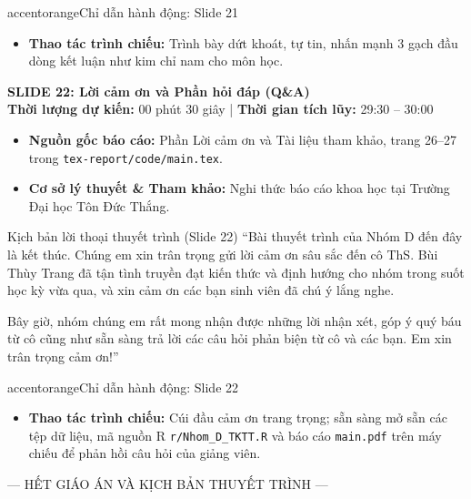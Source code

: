 \documentclass[10pt,a4paper]{article}
\newcommand{\slideheader}[4]{
    \vspace{0.4cm}
    \begin{tcolorbox}[colback=primary!7!white, colframe=primary, arc=2mm, boxrule=1pt, left=4mm, right=4mm, top=2.5mm, bottom=2.5mm]
        {\Large\bfseries\color{primary} SLIDE #1: #2}\\[0.1cm]
        {\small\textbf{Thời lượng dự kiến:} #3 \quad | \quad \textbf{Thời gian tích lũy:} #4}
    \end{tcolorbox}
    \vspace{0.15cm}
}
\begin{document}
\begin{actionbox}{accentorange}{Chỉ dẫn hành động: Slide 21}
    \begin{itemize}
        \item \textbf{Thao tác trình chiếu:} Trình bày dứt khoát, tự tin, nhấn mạnh 3 gạch đầu dòng kết luận như kim chỉ nam cho môn học.
    \end{itemize}
\end{actionbox}

\slideheader{22}{Lời cảm ơn và Phần hỏi đáp (Q\&A)}{00 phút 30 giây}{29:30 -- 30:00}

\begin{itemize}
    \item \textbf{Nguồn gốc báo cáo:} Phần Lời cảm ơn và Tài liệu tham khảo, trang 26--27 trong \texttt{tex-report/code/main.tex}.
    \item \textbf{Cơ sở lý thuyết \& Tham khảo:} Nghi thức báo cáo khoa học tại Trường Đại học Tôn Đức Thắng.
\end{itemize}

\begin{scriptbox}{Kịch bản lời thoại thuyết trình (Slide 22)}
    ``Bài thuyết trình của Nhóm D đến đây là kết thúc. Chúng em xin trân trọng gửi lời cảm ơn sâu sắc đến cô ThS. Bùi Thùy Trang đã tận tình truyền đạt kiến thức và định hướng cho nhóm trong suốt học kỳ vừa qua, và xin cảm ơn các bạn sinh viên đã chú ý lắng nghe.
    
    Bây giờ, nhóm chúng em rất mong nhận được những lời nhận xét, góp ý quý báu từ cô cũng như sẵn sàng trả lời các câu hỏi phản biện từ cô và các bạn. Em xin trân trọng cảm ơn!''
\end{scriptbox}

\begin{actionbox}{accentorange}{Chỉ dẫn hành động: Slide 22}
    \begin{itemize}
        \item \textbf{Thao tác trình chiếu:} Cúi đầu cảm ơn trang trọng; sẵn sàng mở sẵn các tệp dữ liệu, mã nguồn R \texttt{r/Nhom\_D\_TKTT.R} và báo cáo \texttt{main.pdf} trên máy chiếu để phản hồi câu hỏi của giảng viên.
    \end{itemize}
\end{actionbox}

\vspace{0.6cm}
\begin{center}
    {\small\color{gray} --- HẾT GIÁO ÁN VÀ KỊCH BẢN THUYẾT TRÌNH ---}
\end{center}
\end{document}
